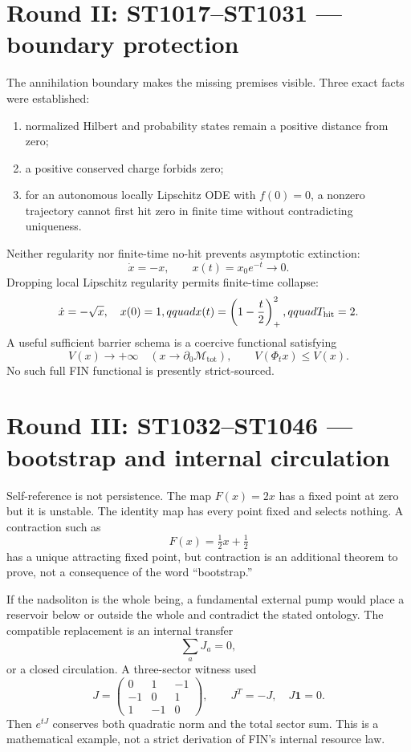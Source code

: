 \documentclass[11pt,a4paper]{article}
\newcommand{\Mtot}{\mathcal M_{\mathrm{tot}}}
\begin{document}
\section{Round II: ST1017--ST1031 --- boundary protection}

The annihilation boundary makes the missing premises visible.  Three exact
facts were established:
\begin{enumerate}
\item normalized Hilbert and probability states remain a positive distance
      from zero;
\item a positive conserved charge forbids zero;
\item for an autonomous locally Lipschitz ODE with $f(0)=0$, a nonzero
      trajectory cannot first hit zero in finite time without contradicting
      uniqueness.
\end{enumerate}

Neither regularity nor finite-time no-hit prevents asymptotic extinction:
\[
 \dot x=-x,\qquad x(t)=x_0e^{-t}\longrightarrow0.
\]
Dropping local Lipschitz regularity permits finite-time collapse:
\[
 \dot x=-\sqrt{x},\quad x(0)=1,qquad
 x(t)=\left(1-\frac t2\right)^2_+,qquad T_{\rm hit}=2.
\]
A useful sufficient barrier schema is a coercive functional satisfying
\[
 V(x)\to+\infty\quad(x\to\partial_0\Mtot),
 \qquad V(\Phi_t x)\le V(x).
\]
No such full FIN functional is presently strict-sourced.

\section{Round III: ST1032--ST1046 --- bootstrap and internal circulation}

Self-reference is not persistence.  The map $F(x)=2x$ has a fixed point at
zero but it is unstable.  The identity map has every point fixed and selects
nothing.  A contraction such as
\[
 F(x)=\tfrac12x+\tfrac12
\]
has a unique attracting fixed point, but contraction is an additional theorem
to prove, not a consequence of the word ``bootstrap.''

If the nadsoliton is the whole being, a fundamental external pump would place
a reservoir below or outside the whole and contradict the stated ontology.
The compatible replacement is an internal transfer
\[
  \sum_a J_a=0,
\]
or a closed circulation.  A three-sector witness used
\[
 J=\begin{pmatrix}0&1&-1\\-1&0&1\\1&-1&0\end{pmatrix},
 \qquad J^T=-J,\quad J\mathbf1=0.
\]
Then $e^{tJ}$ conserves both quadratic norm and the total sector sum.  This is
a mathematical example, not a strict derivation of FIN's internal resource
law.
\end{document}
